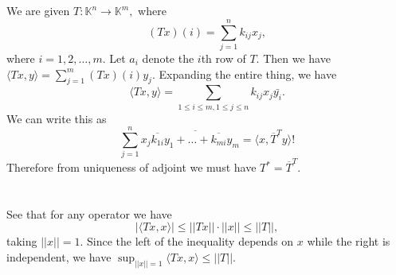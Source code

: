 \documentclass{article}
\begin{document}
\section{} %
\section{} %

We are given $T: \mathbb{K}^n \to \mathbb{K}^m,$ where $$(Tx)(i)=\sum_{j=1}^{n}k_{ij}x_j,$$
where $i=1,2,\dots,m.$ Let $a_i$ denote the $i$th row of $T.$ Then we have $\langle Tx,y \rangle= \sum_{j=1}^m (Tx)(i)y_j.$
Expanding the entire thing, we have $$ \langle Tx,y\rangle= \sum_{1 \leq i \leq m, 1 \leq j \leq n} k_{ij}x_j \bar{y_i}.$$ We can write this as 
$$\sum_{j=1}^n x_j \overline{\overline{k_{1i}}y_1 + \dots + \overline{k_{mi}}y_m} = \langle x, \overline{T}^{T}y \rangle!$$ Therefore from uniqueness of 
adjoint we must have $T^{*}= \overline{T}^{T}.$
\section{} %
See that for any operator we have $$|\langle Tx,x\rangle| \leq ||Tx|| \cdot ||x|| \leq ||T||,$$
taking $||x|| =1.$ Since the left of the inequality depends on $x$ while the right is independent, we have $\sup_{||x||=1}\langle Tx,x\rangle \leq ||T||.$
\end{document}
